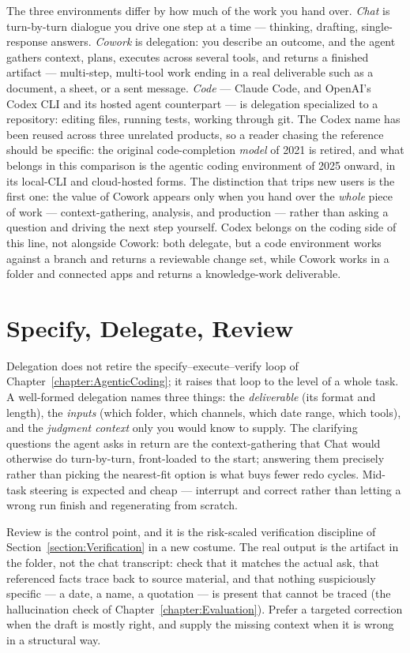 The three environments differ by how much of the work you hand over.
\emph{Chat} is turn-by-turn dialogue you drive one step at a time --- thinking, drafting, single-response answers.
\emph{Cowork} is delegation: you describe an outcome, and the agent gathers context, plans, executes across several tools, and returns a finished artifact --- multi-step, multi-tool work ending in a real deliverable such as a document, a sheet, or a sent message.
\emph{Code} --- Claude Code, and OpenAI's Codex CLI and its hosted agent counterpart --- is delegation specialized to a repository: editing files, running tests, working through git.
The Codex name has been reused across three unrelated products, so a reader chasing the reference should be specific: the original code-completion \emph{model} of 2021 is retired, and what belongs in this comparison is the agentic coding environment of 2025 onward, in its local-CLI and cloud-hosted forms.
The distinction that trips new users is the first one: the value of Cowork appears only when you hand over the \emph{whole} piece of work --- context-gathering, analysis, and production --- rather than asking a question and driving the next step yourself.
Codex belongs on the coding side of this line, not alongside Cowork: both delegate, but a code environment works against a branch and returns a reviewable change set, while Cowork works in a folder and connected apps and returns a knowledge-work deliverable.

\section{Specify, Delegate, Review}

Delegation does not retire the specify--execute--verify loop of Chapter~\ref{chapter:AgenticCoding}; it raises that loop to the level of a whole task.
A well-formed delegation names three things: the \emph{deliverable} (its format and length), the \emph{inputs} (which folder, which channels, which date range, which tools), and the \emph{judgment context} only you would know to supply.
The clarifying questions the agent asks in return are the context-gathering that Chat would otherwise do turn-by-turn, front-loaded to the start; answering them precisely rather than picking the nearest-fit option is what buys fewer redo cycles.
Mid-task steering is expected and cheap --- interrupt and correct rather than letting a wrong run finish and regenerating from scratch.

Review is the control point, and it is the risk-scaled verification discipline of Section~\ref{section:Verification} in a new costume.
The real output is the artifact in the folder, not the chat transcript: check that it matches the actual ask, that referenced facts trace back to source material, and that nothing suspiciously specific --- a date, a name, a quotation --- is present that cannot be traced (the hallucination check of Chapter~\ref{chapter:Evaluation}).
Prefer a targeted correction when the draft is mostly right, and supply the missing context when it is wrong in a structural way.

